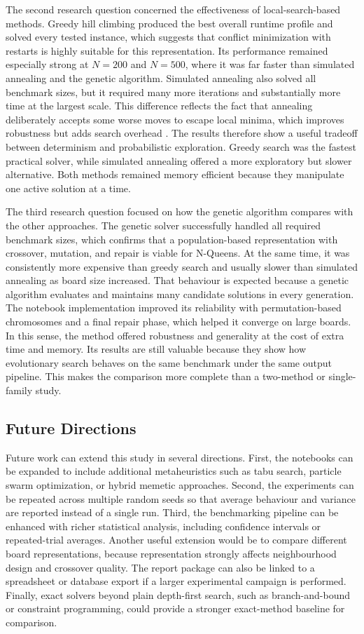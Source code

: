 \documentclass[conference]{IEEEtran}
\begin{document}
The second research question concerned the effectiveness of local-search-based methods. Greedy hill climbing produced the best overall runtime profile and solved every tested instance, which suggests that conflict minimization with restarts is highly suitable for this representation. Its performance remained especially strong at $N=200$ and $N=500$, where it was far faster than simulated annealing and the genetic algorithm. Simulated annealing also solved all benchmark sizes, but it required many more iterations and substantially more time at the largest scale. This difference reflects the fact that annealing deliberately accepts some worse moves to escape local minima, which improves robustness but adds search overhead \cite{kirkpatrick1983optimization,ruiztorrubiano2025mdp}. The results therefore show a useful tradeoff between determinism and probabilistic exploration. Greedy search was the fastest practical solver, while simulated annealing offered a more exploratory but slower alternative. Both methods remained memory efficient because they manipulate one active solution at a time.

The third research question focused on how the genetic algorithm compares with the other approaches. The genetic solver successfully handled all required benchmark sizes, which confirms that a population-based representation with crossover, mutation, and repair is viable for N-Queens. At the same time, it was consistently more expensive than greedy search and usually slower than simulated annealing as board size increased. That behaviour is expected because a genetic algorithm evaluates and maintains many candidate solutions in every generation. The notebook implementation improved its reliability with permutation-based chromosomes and a final repair phase, which helped it converge on large boards. In this sense, the method offered robustness and generality at the cost of extra time and memory. Its results are still valuable because they show how evolutionary search behaves on the same benchmark under the same output pipeline. This makes the comparison more complete than a two-method or single-family study.

\subsection{Future Directions}
Future work can extend this study in several directions. First, the notebooks can be expanded to include additional metaheuristics such as tabu search, particle swarm optimization, or hybrid memetic approaches. Second, the experiments can be repeated across multiple random seeds so that average behaviour and variance are reported instead of a single run. Third, the benchmarking pipeline can be enhanced with richer statistical analysis, including confidence intervals or repeated-trial averages. Another useful extension would be to compare different board representations, because representation strongly affects neighbourhood design and crossover quality. The report package can also be linked to a spreadsheet or database export if a larger experimental campaign is performed. Finally, exact solvers beyond plain depth-first search, such as branch-and-bound or constraint programming, could provide a stronger exact-method baseline for comparison.
\end{document}
